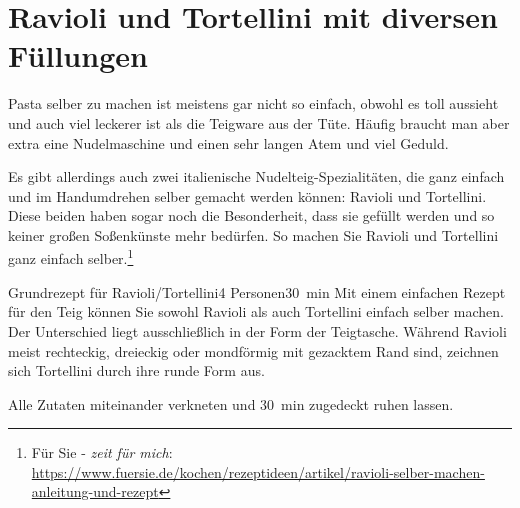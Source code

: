 \section{Ravioli und Tortellini mit diversen Füllungen}
Pasta selber zu machen ist meistens gar nicht so einfach, obwohl es toll aussieht und auch viel leckerer ist als die Teigware aus der Tüte. Häufig braucht man aber extra eine Nudelmaschine und einen sehr langen Atem und viel Geduld.

Es gibt allerdings auch zwei italienische Nudelteig-Spezialitäten, die ganz einfach und im Handumdrehen selber gemacht werden können: Ravioli und Tortellini. Diese beiden haben sogar noch die Besonderheit, dass sie gefüllt werden und so keiner großen Soßenkünste mehr bedürfen. So machen Sie Ravioli und Tortellini ganz einfach selber.\footnote{Für Sie - \textit{zeit für mich}: \url{https://www.fuersie.de/kochen/rezeptideen/artikel/ravioli-selber-machen-anleitung-und-rezept}}

\begin{recipe}{Grundrezept für Ravioli/Tortellini}{4 Personen}{\SI{30}{\minute}}
    \freeform Mit einem einfachen Rezept für den Teig können Sie sowohl Ravioli als auch Tortellini einfach selber machen. Der Unterschied liegt ausschließlich in der Form der Teigtasche. Während Ravioli meist rechteckig, dreieckig oder mondförmig mit gezacktem Rand sind, zeichnen sich Tortellini durch ihre runde Form aus.

    Alle Zutaten miteinander verkneten und \SI{30}{\minute} zugedeckt ruhen lassen.
    \freeform\hrulefill
\end{recipe}

